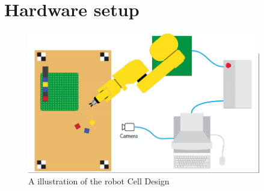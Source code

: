 \chapter{Hardware setup}\label{ch:hardware}
\begin{figure}[hb]
  \centering
  \includegraphics[width=4in]{figures/robotCellDesign.png}
  \caption[robot Cell Design]
   {A illustration of the robot Cell Design}
\end{figure}